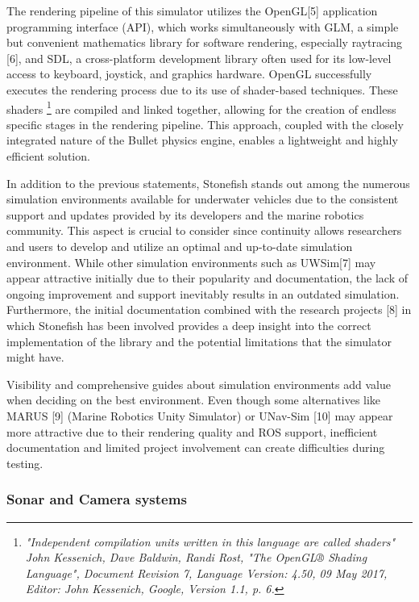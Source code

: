 \documentclass[]{article}
\begin{document}
	\newpage
	
	The rendering pipeline of this simulator utilizes the OpenGL[5] application programming interface (API), which works simultaneously with GLM, a simple but convenient mathematics library for software rendering, especially raytracing [6], and SDL, a cross-platform development library often used for its low-level access to keyboard, joystick, and graphics hardware. OpenGL successfully executes the rendering process due to its use of shader-based techniques. These shaders \footnote[4]{\textit{"Independent compilation units written in this language are called shaders" John Kessenich, Dave Baldwin, Randi Rost, "The OpenGL® Shading Language", Document Revision 7, Language Version: 4.50, 09 May 2017, Editor: John Kessenich, Google, Version 1.1, p. 6.}} are compiled and linked together, allowing for the creation of endless specific stages in the rendering pipeline. This approach, coupled with the closely integrated nature of the Bullet physics engine, enables a lightweight and highly efficient solution.
	
	In addition to the previous statements, Stonefish stands out among the numerous simulation environments available for underwater vehicles due to the consistent support and updates provided by its developers and the marine robotics community. This aspect is crucial to consider since continuity allows researchers and users to develop and utilize an optimal and up-to-date simulation environment. While other simulation environments such as UWSim[7] may appear attractive initially due to their popularity and documentation, the lack of ongoing improvement and support inevitably results in an outdated simulation. Furthermore, the initial documentation combined with the research projects [8] in which Stonefish has been involved provides a deep insight into the correct implementation of the library and the potential limitations that the simulator might have. 
	
	Visibility and comprehensive guides about simulation environments add value when deciding on the best environment. Even though some alternatives like MARUS [9] (Marine Robotics Unity Simulator) or UNav-Sim [10] may appear more attractive due to their rendering quality and ROS support, inefficient documentation and limited project involvement can create difficulties during testing.
	
		\subsubsection{Sonar and Camera systems}
		
\end{document}
